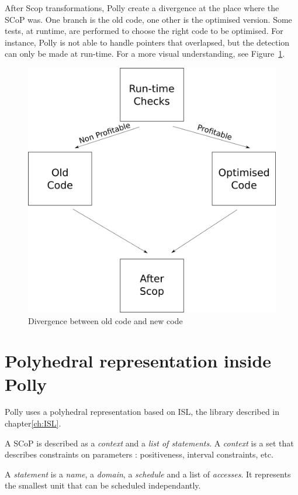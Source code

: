 After Scop transformations, Polly create a divergence at the place where the SCoP was. One branch is the old code, one other is the optimised version. Some tests, at runtime, are performed to choose the right code to be optimised. For instance, Polly is not able to handle pointers that overlapsed, but the detection can only be made at run-time. For a more visual understanding, see Figure~\ref{fig:ScopSplit}.
\begin{figure}
\centering
\includegraphics[scale=0.3]{gfx/Polly/ScopSplit.png}
\caption{Divergence between old code and new code}
\label{fig:ScopSplit}
\end{figure}


\section{Polyhedral representation inside Polly}
Polly uses a polyhedral representation based on ISL, the library described in chapter\ref{ch:ISL}.

A SCoP is described as a \emph{context} and a \emph{list of statements}. A \emph{context} is a set that describes constraints on parameters : positiveness, interval constraints, etc.

A \emph{statement} is a \emph{name}, a \emph{domain}, a \emph{schedule} and a list of \emph{accesses}. It represents the smallest unit that can be scheduled independantly.

